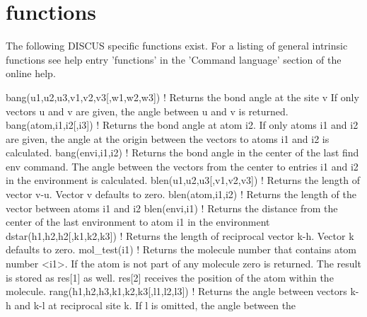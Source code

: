\section{functions}
\par
The following DISCUS specific functions exist. For a listing 
of general intrinsic functions see help entry 'functions' in 
the 'Command language' section of the online help. 
\par
\begin{MacVerbatim}
bang(u1,u2,u3,v1,v2,v3[,w1,w2,w3])
                                ! Returns the bond angle at the site v
                                  If only vectors u and v are given, the
                                  angle between u and v is returned.
bang(atom,i1,i2[,i3])           ! Returns the bond angle at atom i2.
                                  If only atoms i1 and i2 are given, the
                                  angle at the origin between the vectors
                                  to atoms i1 and i2 is calculated.
bang(envi,i1,i2)                ! Returns the bond angle in the center of
                                  the last find env command. The angle
                                  between the vectors from the center to
                                  entries i1 and i2 in the environment is
                                  calculated.
blen(u1,u2,u3[,v1,v2,v3])       ! Returns the length of vector v-u.
                                  Vector v defaults to zero.
blen(atom,i1,i2)                ! Returns the length of the vector
                                  between atoms i1 and i2
blen(envi,i1)                   ! Returns the distance from the center of
                                  the last environment to atom i1 in the
                                  environment
dstar(h1,h2,h2[,k1,k2,k3])      ! Returns the length of reciprocal
                                  vector k-h. Vector k defaults to zero.
mol_test(i1)                    ! Returns the molecule number that contains
                                   atom number <i1>. If the atom is not part
                                  of any molecule zero is returned. The
                                  result is stored as res[1] as well.
                                  res[2] receives the position of the atom
                                  within the molecule.
rang(h1,h2,h3,k1,k2,k3[,l1,l2,l3])
                                ! Returns the angle between vectors
                                  k-h and k-l at reciprocal site k.
                                  If l is omitted, the angle between the

\end{MacVerbatim}
